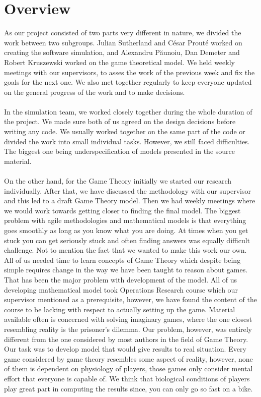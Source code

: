 \documentclass[10pt, a4paper]{report}
\begin{document}
\section{Overview}\label{sec:pmoverview}
As our project consisted of two parts very different in nature, we divided the work between two subgroups. Julian Sutherland and C\'{e}sar Prout\'{e} worked on creating the software simulation, and Alexandru P\u{a}unoiu, Dan Demeter and Robert Kruszewski worked on the game theoretical model. We held weekly meetings with our supervisors, to asses the work of the previous week and fix the goals for the next one. We also met together regularly to keep everyone updated on the general progress of the work and to make decisions.
\\\\
In the simulation team, we worked closely together during the whole duration of the project. We made sure both of us agreed on the design decisions before writing any code. We usually worked together on the same part of the code or divided the work into small individual tasks. However, we still faced difficulties. The biggest one being underspecification of models presented in the source material.
\\\\
On the other hand, for the Game Theory initially we started our research individually. After that, we have discussed the methodology with our supervisor and this led to a draft Game Theory model. Then we had weekly meetings where we would work towards getting closer to finding the final model. The biggest problem with agile methodologies and mathematical models is that everything goes smoothly as long as you know what you are doing. At times when you get stuck you can get seriously stuck and often finding answers was equally difficult challenge. Not to mention the fact that we wanted to make this work our own. All of us needed time to learn concepts of Game Theory which despite being simple requires change in the way we have been taught to reason about games. That has been the major problem with development of the model. All of us developing mathematical model took Operations Research course which our supervisor mentioned as a prerequisite, however, we have found the content of the course to be lacking with respect to actually setting up the game. Material available often is concerned with solving imaginary games, where the one closest resembling reality is the prisoner's dilemma. Our problem, however, was entirely different from the one considered by most authors in the field of Game Theory. Our task was to develop model that would give results to real situation. Every game considered by game theory resembles some aspect of reality, however, none of them is dependent on physiology of players, those games only consider mental effort that everyone is capable of. We think that biological conditions of players play great part in computing the results since, you can only go so fast on a bike.
\end{document}
